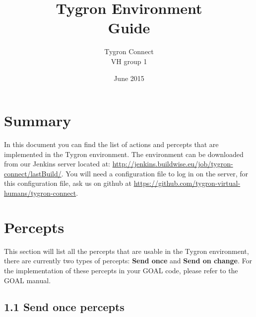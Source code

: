 \documentclass[english,11pt]{report}
\title{Tygron Environment \\ Guide}
\author{Tygron Connect \\ VH group 1}
\date{June 2015}
\begin{document}
\maketitle
\tableofcontents

\chapter*{Summary}

In this document you can find the list of actions and percepts that are implemented in the Tygron environment. The environment can be downloaded from our Jenkins server located at: \url{http://jenkins.buildwise.eu/job/tygron-connect/lastBuild/}. You will need a configuration file to log in on the server, for this configuration file, ask us on github at \url{https://github.com/tygron-virtual-humans/tygron-connect}.


\chapter{Percepts}

This section will list all the percepts that are usable in the Tygron environment, there are currently two types of percepts: \textbf{Send once} and \textbf{Send on change}. For the implementation of these percepts in your GOAL code, please refer to the GOAL manual.

\newpage
\section*{1.1 Send once percepts}
\end{document}
